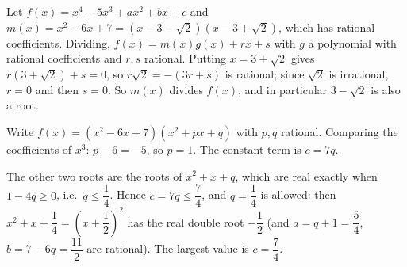 Let $f(x)=x^4-5x^3+ax^2+bx+c$ and $m(x)=x^2-6x+7=(x-3-\sqrt2)(x-3+\sqrt2)$, which has rational coefficients. Dividing, $f(x)=m(x)g(x)+rx+s$ with $g$ a polynomial with rational coefficients and $r,s$ rational. Putting $x=3+\sqrt2$ gives $r(3+\sqrt2)+s=0$, so $r\sqrt2=-(3r+s)$ is rational; since $\sqrt2$ is irrational, $r=0$ and then $s=0$. So $m(x)$ divides $f(x)$, and in particular $3-\sqrt2$ is also a root.

Write $f(x)=(x^2-6x+7)(x^2+px+q)$ with $p,q$ rational. Comparing the coefficients of $x^3$: $p-6=-5$, so $p=1$. The constant term is $c=7q$.

The other two roots are the roots of $x^2+x+q$, which are real exactly when $1-4q\ge0$, i.e.\ $q\le\dfrac{1}{4}$. Hence $c=7q\le\dfrac{7}{4}$, and $q=\dfrac{1}{4}$ is allowed: then $x^2+x+\dfrac{1}{4}=\left(x+\dfrac{1}{2}\right)^2$ has the real double root $-\dfrac{1}{2}$ (and $a=q+1=\dfrac{5}{4}$, $b=7-6q=\dfrac{11}{2}$ are rational). The largest value is $c=\boxed{\dfrac{7}{4}}$.
